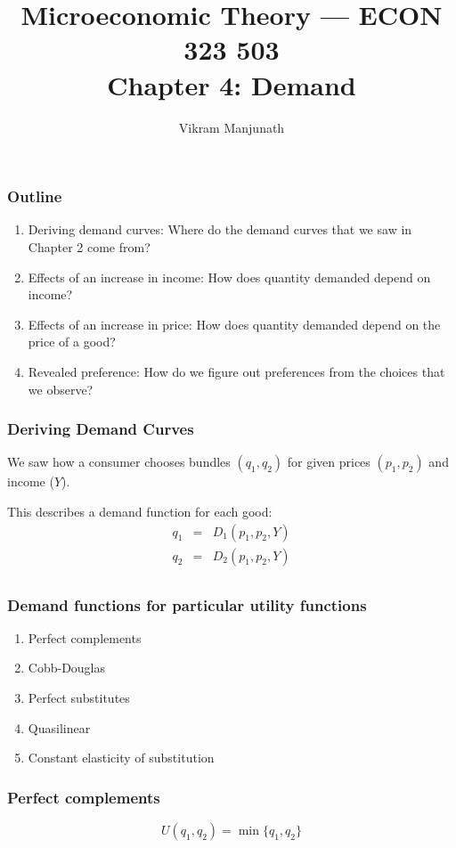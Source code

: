 \documentclass[xcolor=pdftex,dvipsnames]{beamer}
\title{Microeconomic Theory --- ECON 323 503 \\ Chapter 4: Demand}
\author{Vikram Manjunath}
\institute{Texas A\&M University}
\begin{document}
\maketitle

\begin{frame}
\frametitle{Outline}
\begin{enumerate}[<+->]
\item Deriving demand curves: Where do the demand curves that we saw
  in Chapter 2 come from?
\item Effects of an increase in income: How does quantity demanded
  depend on income?
\item Effects of an increase in price:  How does quantity demanded
  depend on the price of a good?
\item Revealed preference: How do we figure out preferences from the
  choices that we observe?
\end{enumerate}
\end{frame}

\begin{frame}
\frametitle{Deriving Demand Curves}
We saw how a consumer chooses bundles $(q_1,q_2)$ for given prices
$(p_1,p_2)$ and income  ($Y$).

This describes a demand function for each good:
\[
\begin{array}
{rcl}
q_1 &=& D_1(p_1,p_2,Y)\\
q_2 &=& D_2(p_1,p_2,Y)\\
\end{array}
\]

\end{frame}

\begin{frame}
\frametitle{Demand functions for particular utility functions}
\begin{enumerate}
\item Perfect complements
\item Cobb-Douglas
\item Perfect substitutes
\item Quasilinear
\item Constant elasticity of substitution
\end{enumerate}
\end{frame}


\begin{frame}
\frametitle{Perfect complements}
\[
U(q_1,q_2) = \min\{q_1,q_2\}
\]



\end{frame}
\end{document}
